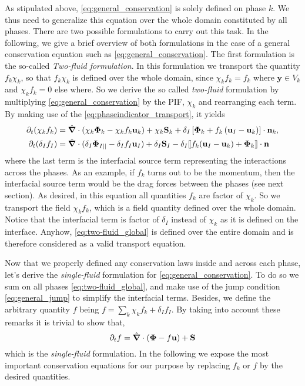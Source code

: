 As stipulated above, \ref{eq:general_conservation} is solely defined on phase $k$.
We thus need to generalize this equation over the whole domain constituted by all phases.
There are two possible formulations to carry out this task.
In the following, we give a brief overview of both formulations in the case of a general conservation equation such as \ref{eq:general_conservation}.
The first formulation is the so-called \textit{Two-fluid formulation}.
In this formulation we transport the quantity $f_k\chi_k$, so that $f_k\chi_k$ is defined over the whole domain, since $\chi_k f_k = f_k$ where $\textbf{y} \in V_k$ and $\chi_k f_k = 0$ else where.
So we derive the so called \textit{two-fluid} formulation by multiplying \ref{eq:general_conservation} by the PIF, $\chi_k$ and rearranging each term.
By making use of the \ref{eq:phaseindicator_transport}, it yields
\begin{align}
    \partial_t (\chi_k f_k)
    &= \hat{\bm{\nabla}} \cdot (\chi_k \bm{\Phi}_k - \chi_k f_k \textbf{u}_k)
    + \chi_k \textbf{S}_k
    + \delta_I\left[
        \bm{\Phi}_k
        + f_k
        \left(
            \textbf{u}_I
            - \textbf{u}_k
        \right)
    \right]
    \cdot \textbf{n}_k ,
    \label{eq:two-fluid_global}\\
    \partial_t (\delta_If_I)  
    &= 
    \hat{\bm{\nabla}} \cdot (\delta_I \mathbf{\Phi}_{I||} - \delta_I f_I \textbf{u}_I)
    +\delta_I\textbf{S}_I 
    - \delta_I \llbracket 
    f_k (\textbf{u}_I - \textbf{u}_k)
    + \mathbf{\Phi}_k
     \rrbracket \cdot \textbf{n} 
    \label{ap:eq:general_jump}
\end{align}
where the last term is the interfacial source term representing the interactions across the phases.
As an example, if $f_k$ turns out to be the momentum, then the interfacial source term would be the drag forces between the phases (see next section).
As desired, in this equation all quantities $f_k$ are factor of $\chi_k$.
So we transport the field $\chi_k f_k$, which is a field quantity defined over the whole domain.
Notice that the interfacial term is factor of $\delta_I$ instead of $\chi_k$ as it is defined on the interface.
Anyhow, \ref{eq:two-fluid_global} is defined over the entire domain and is therefore considered as a valid transport equation.

Now that we properly defined any conservation laws inside and across each phase, let's derive the \textit{single-fluid} formulation for \ref{eq:general_conservation}.
To do so we sum on all phases \ref{eq:two-fluid_global}, and make use of the jump condition \ref{eq:general_jump} to simplify the interfacial terms.
Besides, we define the arbitrary quantity $f$ being $f = \sum_k \chi_k f_k + \delta_I f_I$.
By taking into account these remarks it is trivial to show that,
\begin{equation}
    \partial_t f
    = \hat{\bm{\nabla}} \cdot (\bm{\Phi} - f \textbf{u})
    + \textbf{S}
    \label{eq:single-fluid_global}
\end{equation}
which is the \textit{single-fluid} formulation.
In the following we expose the most important conservation equations for our purpose by replacing $f_k$ or $f$ by the desired quantities.

